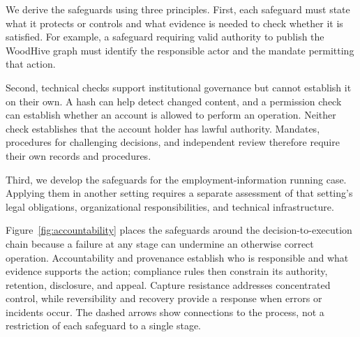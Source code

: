 \documentclass[journal]{IEEEtran}
\begin{document}
We derive the safeguards using three principles. First,
each safeguard must state what it protects or controls
and what evidence is needed to check whether it is satisfied.
For example, a safeguard requiring valid authority to publish
the WoodHive graph must identify the responsible actor and
the mandate permitting that action.

Second, technical checks support institutional governance
but cannot establish it on their own. A hash can help detect
changed content, and a permission check can establish whether
an account is allowed to perform an operation. Neither check
establishes that the account holder has lawful authority.
Mandates, procedures for challenging decisions, and independent
review therefore require their own records and procedures.

Third, we develop the safeguards for the employment-information
running case. Applying them in another setting requires
a separate assessment of that setting's legal obligations,
organizational responsibilities, and technical infrastructure.

Figure~\ref{fig:accountability} places the safeguards around the
decision-to-execution chain because a failure at any stage can undermine
an otherwise correct operation. Accountability and provenance establish
who is responsible and what evidence supports the action; compliance
rules then constrain its authority, retention, disclosure, and appeal.
Capture resistance addresses concentrated control, while reversibility
and recovery provide a response when errors or incidents occur.
The dashed arrows show connections to the process, not a restriction
of each safeguard to a single stage.
\end{document}
